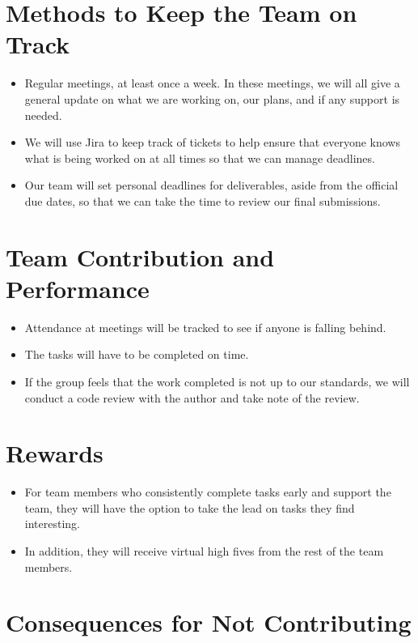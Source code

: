 \documentclass{article}
\begin{document}
\section*{Methods to Keep the Team on Track}
\begin{itemize}
    \item Regular meetings, at least once a week. In these meetings, we will all give a general update on what we are working on, our plans, and if any support is needed.
    \item We will use Jira to keep track of tickets to help ensure that everyone knows what is being worked on at all times so that we can manage deadlines.
    \item Our team will set personal deadlines for deliverables, aside from the official due dates, so that we can take the time to review our final submissions.
\end{itemize}

\section*{Team Contribution and Performance}

\begin{itemize}
    \item Attendance at meetings will be tracked to see if anyone is falling behind.
    \item The tasks will have to be completed on time.
    \item If the group feels that the work completed is not up to our standards, we will conduct a code review with the author and take note of the review.
\end{itemize}

\section*{Rewards}

\begin{itemize}
    \item For team members who consistently complete tasks early and support the team, they will have the option to take the lead on tasks they find interesting.
    \item In addition, they will receive virtual high fives from the rest of the team members.
\end{itemize}

\section*{Consequences for Not Contributing}
\end{document}
